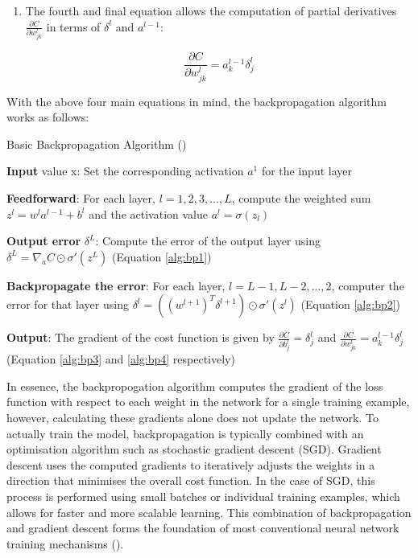 \begin{enumerate}
    \item The fourth and final equation allows the computation of partial derivatives $\frac{\partial C}{\partial w_{jk}^l}$ in terms of $\delta^l$ and $a^{l-1}$:
    \begin{ceqn}
        \begin{equation}\label{alg:bp4}
            \frac{\partial C}{\partial w_{jk}^l} = a_k^{l-1}\delta_j^l
        \end{equation}
    \end{ceqn}
\end{enumerate}

\parbreak\noindent With the above four main equations in mind, the backpropagation algorithm works as follows:

\begin{algorithm}[H]
	\caption{Basic Backpropagation Algorithm (\cite{nielsen2015neural})}\label{alg:backpropogation_algorithm}
	\begin{algorithmic}[1]
    \item \textbf{Input} value x: Set the corresponding activation $a^1$ for the input layer
    \item \textbf{Feedforward}: For each layer, $l=1,2,3,...,L$, compute the weighted sum $z^l=w^la^{l-1}+b^l$ and the activation value $a^l=\sigma(z_l)$
	\item \textbf{Output error} $\delta^L$: Compute the error of the output layer using $\delta^L=\nabla_aC\odot\sigma'(z^L)$ (Equation \ref{alg:bp1})
	\item \textbf{Backpropagate the error}: For each layer, $l=L-1, L-2,...,2$, computer the error for that layer using $\delta^l=((w^{l+1})^T\delta^{l+1}) \odot\sigma'(z^l)$ (Equation \ref{alg:bp2})
	\item \textbf{Output}: The gradient of the cost function is given by $\frac{\partial C}{\partial b_j^l} = \delta_j^l$ and $\frac{\partial C}{\partial w_{jk}^l} = a_k^{l-1}\delta_j^l$ (Equation \ref{alg:bp3} and \ref{alg:bp4} respectively)
\end{algorithmic}
\end{algorithm}

\parbreak\noindent In essence, the backpropogation algorithm computes the gradient of the loss function with respect to each weight in the network for a single training example, however, calculating these gradients alone does not update the network. To actually train the model, backpropagation is typically combined with an optimisation algorithm such as stochastic gradient descent (SGD). Gradient descent uses the computed gradients to iteratively adjusts the weights in a direction that minimises the overall cost function. In the case of SGD, this process is performed using small batches or individual training examples, which allows for faster and more scalable learning. This combination of backpropagation and gradient descent forms the foundation of most conventional neural network training mechanisms (\cite{nielsen2015neural}).

